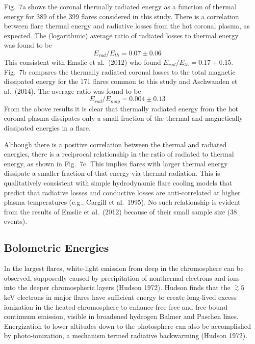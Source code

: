\documentclass[10pt,preprint]{aastex}  %
\def\gapprox{\lower.4ex\hbox{$\;\buildrel >\over{\scriptstyle\sim}\;$}}
\begin{document}
Fig.~7a shows the coronal thermally radiated energy as a function 
of thermal energy for 389 of the 399 flares considered in this study. 
There is a correlation between flare thermal energy and radiative 
losses from the hot coronal plasma, as expected. The (logarithmic)
average ratio of radiated losses to thermal energy was found to be
\begin{equation}
		E_{rad}/E_{th} = 0.07 \pm 0.06
\end{equation}
This consistent with Emslie et al.~(2012) who found $E_{rad}/E_{th} 
= 0.17 \pm 0.15$.  
Fig.~7b compares the thermally radiated coronal losses to the 
total magnetic dissipated energy for the 171 flares common to 
this study and Aschwanden et al.~(2014). The 
average ratio was found to be
\begin{equation}
		E_{rad}/E_{mag} = 0.004 \pm 0.13
\end{equation}
From the above results it is clear that thermally radiated energy 
from the hot coronal plasma dissipates only a small fraction of the 
thermal and magnetically dissipated energies in a flare.

Although there is a positive correlation between the thermal and 
radiated energies, there is a reciprocal relationship 
in the ratio of radiated to thermal energy, as shown in Fig.~7c. 
This implies flares with larger thermal 
energy dissipate a smaller fraction of that energy via thermal 
radiation.  This is qualitatively consistent with simple hydrodynamic 
flare cooling models that predict that radiative losses and 
conductive losses are anti-correlated at higher plasma temperatures 
(e.g., Cargill et al.~1995).  No such relationship is evident from 
the results of Emslie et al.~(2012) because of their small sample 
size (38 events).

\subsection{		Bolometric Energies			}

In the largest flares, white-light emission from deep in the 
chromosphere can be observed, supposedly caused by precipitation
of nonthermal electrons and ions into the deeper chromospheric
layers (Hudson 1972). Hudson finds that the $\gapprox 5$ keV
electrons in major flares have sufficient energy to create
long-lived excess ionization in the heated chromosphere to
enhance free-free and free-bound continuum emission, visible
in broadened hydrogen Balmer and Paschen lines. Energization
to lower altitudes down to the photosphere can also be accomplished by
photo-ionization, a mechanism termed radiative backwarming
(Hudson 1972).
\end{document}
